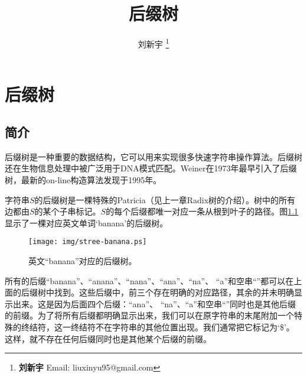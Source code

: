 \documentclass[UTF8]{article}
\begin{document}


\title{后缀树}

\author{刘新宇
\thanks{{\bfseries 刘新宇 } \newline
  Email: liuxinyu95@gmail.com \newline}
  }

\maketitle
\fi


\ifx\wholebook\relax
\chapter{后缀树}
\fi


\section{简介}
\label{introduction}

后缀树是一种重要的数据结构，它可以用来实现很多快速字符串操作算法\cite{wiki-suffix-tree}。后缀树还在生物信息处理中被广泛用于DNA模式匹配\cite{ukkonen-presentation}。Weiner在1973年最早引入了后缀树\cite{weiner73}，最新的on-line构造算法发现于1995年\cite{ukkonen95}。

字符串$S$的后缀树是一棵特殊的Patricia（见上一章Radix树的介绍）。树中的所有边都由$S$的某个子串标记。$S$的每个后缀都唯一对应一条从根到叶子的路径。图\ref{fig:stree-banana}显示了一棵对应英文单词‘banana’的后缀树。

\begin{figure}[htbp]
  \centering
  \texttt{[image: img/stree-banana.ps]}
  \caption{英文“banana”对应的后缀树。} \label{fig:stree-banana}
\end{figure}

所有的后缀“banana”、“anana”、“nana”、“ana”、“na”、
“a”和空串“”都可以在上面的后缀树中找到。这些后缀中，前三个存在明确的对应路径，其余的并未明确显示出来。这是因为后面四个后缀：“ana”、
“na”、“a”和空串“”同时也是其他后缀的前缀。为了将所有后缀都明确显示出来，我们可以在原字符串的末尾附加一个特殊的终结符，这一终结符不在字符串的其他位置出现。我们通常把它标记为‘\$’。这样，就不存在任何后缀同时也是其他某个后缀的前缀。
\end{document}
